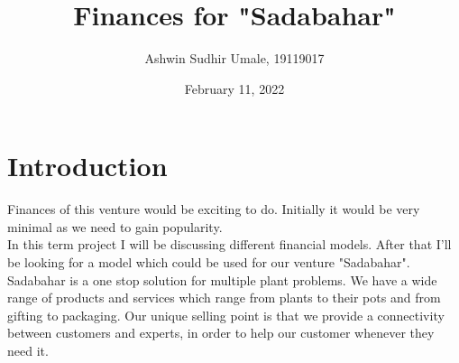 \documentclass{article}
\title{Finances for "Sadabahar"}
\author{Ashwin Sudhir Umale, 19119017}
\date{February 11, 2022}
\begin{document}
\maketitle


\section{Introduction}

Finances of this venture would be exciting to do. Initially it would be very minimal as we need to gain popularity.
\\
In this term project I will be discussing different financial models. After that I'll be looking for a model which could be used for our venture "Sadabahar".
\\
Sadabahar is a one stop solution for multiple plant problems. We have a wide range of products and services which range from plants to their pots and from gifting to packaging. Our unique selling point is that we provide a connectivity between customers and experts, in order to help our customer whenever they need it.
\end{document}
